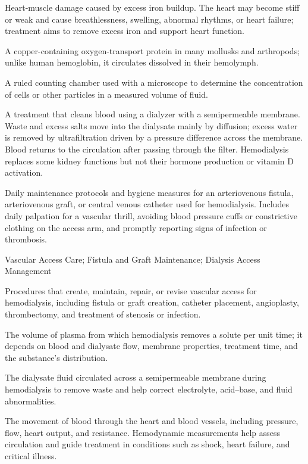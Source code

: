  Heart-muscle damage caused by excess iron buildup. The heart may become stiff or weak and cause breathlessness, swelling, abnormal rhythms, or heart failure; treatment aims to remove excess iron and support heart function.

 A copper-containing oxygen-transport protein in many mollusks and arthropods; unlike human hemoglobin, it circulates dissolved in their hemolymph.

 A ruled counting chamber used with a microscope to determine the concentration of cells or other particles in a measured volume of fluid.

 A treatment that cleans blood using a dialyzer with a semipermeable membrane. Waste and excess salts move into the dialysate mainly by diffusion; excess water is removed by ultrafiltration driven by a pressure difference across the membrane. Blood returns to the circulation after passing through the filter. Hemodialysis replaces some kidney functions but not their hormone production or vitamin D activation.

 Daily maintenance protocols and hygiene measures for an arteriovenous fistula, arteriovenous graft, or central venous catheter used for hemodialysis. Includes daily palpation for a vascular thrill, avoiding blood pressure cuffs or constrictive clothing on the access arm, and promptly reporting signs of infection or thrombosis.

\synonyms
Vascular Access Care; Fistula and Graft Maintenance; Dialysis Access Management

 Procedures that create, maintain, repair, or revise vascular access for hemodialysis, including fistula or graft creation, catheter placement, angioplasty, thrombectomy, and treatment of stenosis or infection.

 The volume of plasma from which hemodialysis removes a solute per unit time; it depends on blood and dialysate flow, membrane properties, treatment time, and the substance’s distribution.

 The dialysate fluid circulated across a semipermeable membrane during hemodialysis to remove waste and help correct electrolyte, acid--base, and fluid abnormalities.

 The movement of blood through the heart and blood vessels, including pressure, flow, heart output, and resistance. Hemodynamic measurements help assess circulation and guide treatment in conditions such as shock, heart failure, and critical illness.

